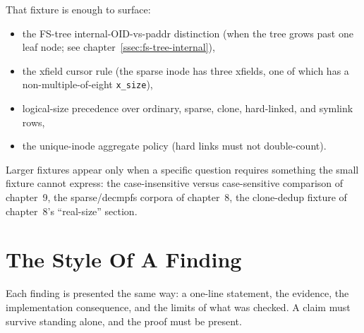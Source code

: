 That fixture is enough to surface:

\begin{itemize}
  \item the FS-tree internal-OID-vs-paddr distinction (when the
    tree grows past one leaf node; see chapter~\ref{ssec:fs-tree-internal}),
  \item the xfield cursor rule (the sparse inode has three xfields,
    one of which has a non-multiple-of-eight \texttt{x\_size}),
  \item logical-size precedence over ordinary, sparse, clone,
    hard-linked, and symlink rows,
  \item the unique-inode aggregate policy (hard links must not
    double-count).
\end{itemize}

Larger fixtures appear only when a specific question requires
something the small fixture cannot express: the case-insensitive
versus case-sensitive comparison of chapter~9, the
sparse/decmpfs corpora of chapter~8, the clone-dedup fixture of
chapter~8's ``real-size'' section.

\section{The Style Of A Finding}

Each finding is presented the same way: a one-line statement, the
evidence, the implementation consequence, and the limits of what
was checked. A claim must survive standing alone, and the proof
must be present.
